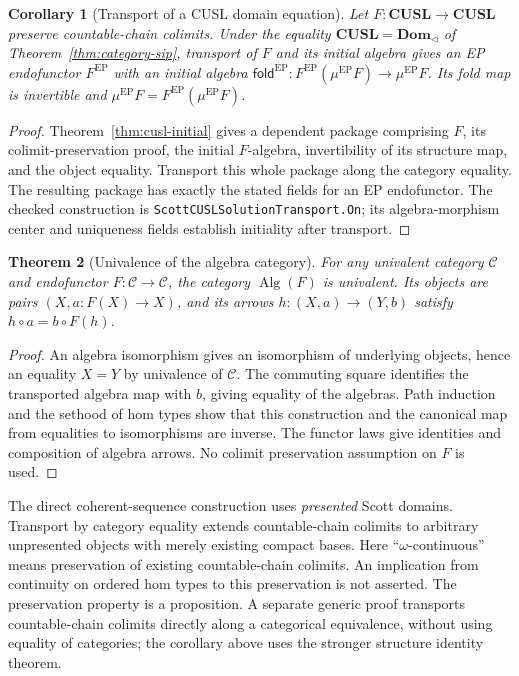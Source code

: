 \documentclass[11pt,a4paper]{article}
\newtheorem{theorem}{Theorem}[section]
\newtheorem{corollary}[theorem]{Corollary}
\theoremstyle{definition}
\theoremstyle{remark}
\begin{document}
\begin{corollary}[Transport of a CUSL domain equation]
\label{cor:cusl-solution-transport}
Let $F:\mathbf{CUSL}\to\mathbf{CUSL}$ preserve countable-chain
colimits. Under the equality
$\mathbf{CUSL}=\mathbf{Dom}_{\triangleleft}$ of
Theorem~\ref{thm:category-sip}, transport of $F$ and its initial algebra
gives an EP endofunctor $F^{\mathrm{EP}}$ with an initial algebra
$\mathsf{fold}^{\mathrm{EP}}:F^{\mathrm{EP}}(\mu^{\mathrm{EP}}F)
\to\mu^{\mathrm{EP}}F$. Its fold map is invertible and
$\mu^{\mathrm{EP}}F=F^{\mathrm{EP}}(\mu^{\mathrm{EP}}F)$.
\end{corollary}
\begin{proof}
Theorem~\ref{thm:cusl-initial} gives a dependent package comprising
$F$, its colimit-preservation proof, the initial $F$-algebra, invertibility
of its structure map, and the object equality. Transport this whole
package along the category equality. The resulting package has exactly
the stated fields for an EP endofunctor. The checked construction is
\texttt{ScottCUSLSolutionTransport.On}; its algebra-morphism center and
uniqueness fields establish initiality after transport.
\end{proof}

\begin{theorem}[Univalence of the algebra category]
For any univalent category $\mathcal C$ and endofunctor
$F:\mathcal C\to\mathcal C$, the category $\operatorname{Alg}(F)$ is
univalent. Its objects are pairs $(X,a:F(X)\to X)$, and its arrows
$h:(X,a)\to(Y,b)$ satisfy $h\circ a=b\circ F(h)$.
\end{theorem}
\begin{proof}
An algebra isomorphism gives an isomorphism of underlying objects, hence
an equality $X=Y$ by univalence of $\mathcal C$. The commuting square
identifies the transported algebra map with $b$, giving equality of the
algebras. Path induction and the sethood of hom types show that this
construction and the canonical map from equalities to isomorphisms are
inverse. The functor laws give identities and composition of algebra
arrows. No colimit preservation assumption on $F$ is used.
\end{proof}

The direct coherent-sequence construction uses \emph{presented} Scott
domains. Transport by category equality extends countable-chain colimits
to arbitrary unpresented objects with merely existing compact bases.
Here ``$\omega$-continuous'' means
preservation of existing countable-chain colimits. An implication from
continuity on ordered hom types to this preservation is not asserted.
The preservation property is a proposition. A separate generic proof
transports countable-chain colimits directly along a categorical
equivalence, without using equality of categories; the corollary above
uses the stronger structure identity theorem.
\end{document}
